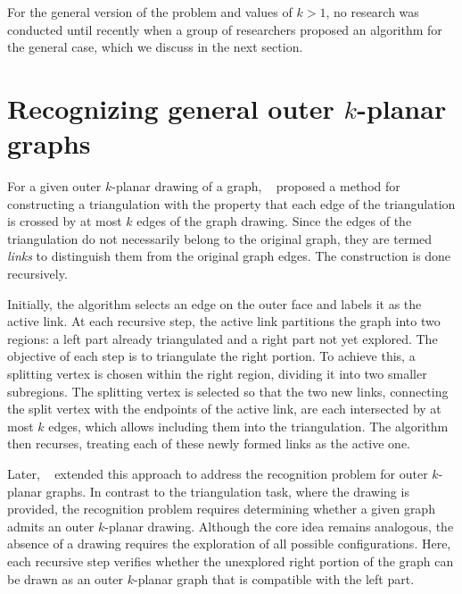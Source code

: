 For the general version of the problem and values of \(k > 1\), no research was conducted until recently when a group of researchers proposed an algorithm for the general case, which we discuss in the next section.


\section{Recognizing general outer \(k\)-planar graphs}

For a given outer \(k\)-planar drawing of a graph, \citeauthor{triangulations}~\cite{triangulations} proposed a method for constructing a triangulation with the property that each edge of the triangulation is crossed by at most \(k\) edges of the graph drawing. Since the edges of the triangulation do not necessarily belong to the original graph, they are termed \emph{links} to distinguish them from the original graph edges. The construction is done recursively.

Initially, the algorithm selects an edge on the outer face and labels it as the active link. At each recursive step, the active link partitions the graph into two regions: a left part already triangulated and a right part not yet explored. The objective of each step is to triangulate the right portion. To achieve this, a splitting vertex is chosen within the right region, dividing it into two smaller subregions. The splitting vertex is selected so that the two new links, connecting the split vertex with the endpoints of the active link, are each intersected by at most \(k\) edges, which allows including them into the triangulation. The algorithm then recurses, treating each of these newly formed links as the active one.

Later, \citeauthor{okp}~\cite{okp} extended this approach to address the recognition problem for outer \(k\)-planar graphs. In contrast to the triangulation task, where the drawing is provided, the recognition problem requires determining whether a given graph admits an outer \(k\)-planar drawing. Although the core idea remains analogous, the absence of a drawing requires the exploration of all possible configurations. Here, each recursive step verifies whether the unexplored right portion of the graph can be drawn as an outer \(k\)-planar graph that is compatible with the left part.

